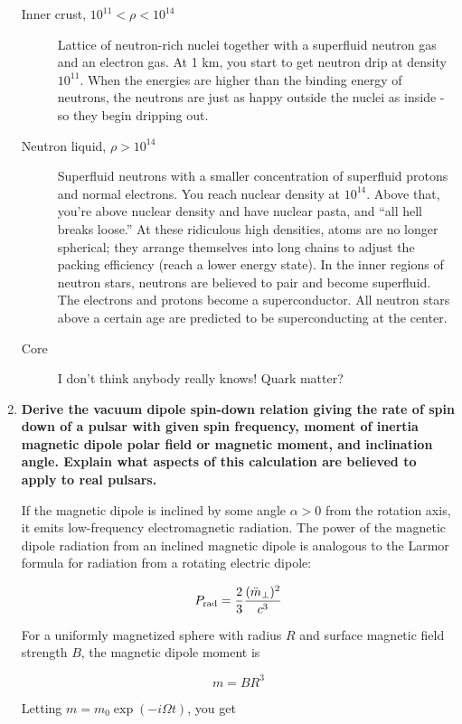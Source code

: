 \documentclass[a4paper]{article}
\begin{document}
\begin{enumerate}
\begin{description}
\item[Inner crust, $10^{11} < \rho < 10^{14}$] Lattice of neutron-rich nuclei together with a superfluid neutron gas and an electron gas. At 1 km, you start to get neutron drip at density $10^{11}$. When the energies are higher than the binding energy of neutrons, the neutrons are just as happy outside the nuclei as inside - so they begin dripping out. 

\item[Neutron liquid, $\rho > 10^{14}$] Superfluid neutrons with a smaller concentration of superfluid protons and normal electrons. You reach nuclear density at $10^{14}$. Above that, you're above nuclear density and have nuclear pasta, and ``all hell breaks loose.'' At these ridiculous high densities, atoms are no longer spherical; they arrange themselves into long chains to adjust the packing efficiency (reach a lower energy state). In the inner regions of neutron stars, neutrons are believed to pair and become superfluid. The electrons and protons become a superconductor. All neutron stars above a certain age are predicted to be superconducting at the center. 

\item[Core] I don't think anybody really knows! Quark matter? 

\end{description}




\item \textbf{Derive the vacuum dipole spin-down relation giving the rate of spin down of a pulsar with given spin frequency, moment of inertia magnetic dipole polar field or magnetic moment, and inclination angle. Explain what aspects of this calculation are believed to apply to real
pulsars.}

If the magnetic dipole is inclined by some angle $\alpha > 0$ from the rotation axis, it emits low-frequency electromagnetic radiation. The power of the magnetic dipole radiation from an inclined magnetic dipole is analogous to the Larmor formula for radiation from a rotating electric dipole:

$$ {P_{\rm rad} = {2 \over 3} { (
\ddot{m}_\bot )^2 \over c^3}}\rlap{\quad \rm } $$

For a uniformly magnetized sphere with radius $R$ and surface magnetic field strength $B$, the magnetic dipole moment is

$$ m = B R^3 $$

Letting $m =m_0 \exp ( - i \Omega t)$, you get


\end{enumerate}
\end{document}
